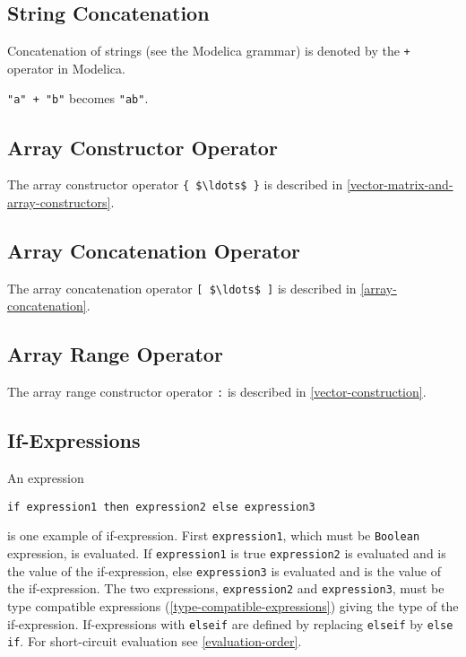 \subsection{String Concatenation}\label{string-concatenation}

Concatenation of strings (see the Modelica grammar) is denoted by the \lstinline!+!
operator in Modelica.

\begin{example}
\lstinline!"a" + "b"! becomes \lstinline!"ab"!.
\end{example}

\subsection{Array Constructor Operator}\label{array-constructor-operator}

The array constructor operator \lstinline!{ $\ldots$ }! is described in \cref{vector-matrix-and-array-constructors}.

\subsection{Array Concatenation Operator}\label{array-concatenation-operator}

The array concatenation operator \lstinline![ $\ldots$ ]! is described in \cref{array-concatenation}.

\subsection{Array Range Operator}\label{array-range-operator}

The array range constructor operator \lstinline!:! is described in \cref{vector-construction}.

\subsection{If-Expressions}\label{if-expressions}

An expression
\begin{lstlisting}[language=modelica]
if expression1 then expression2 else expression3
\end{lstlisting}
is one example of if-expression. First \lstinline!expression1!, which must be
\lstinline!Boolean! expression, is evaluated. If \lstinline!expression1! is true \lstinline!expression2! is
evaluated and is the value of the if-expression, else \lstinline!expression3! is
evaluated and is the value of the if-expression. The two expressions,
\lstinline!expression2! and \lstinline!expression3!, must be type compatible expressions
(\cref{type-compatible-expressions}) giving the type of the if-expression. If-expressions with
\lstinline!elseif! are defined by replacing \lstinline!elseif! by \lstinline!else if!. For
short-circuit evaluation see \cref{evaluation-order}.

